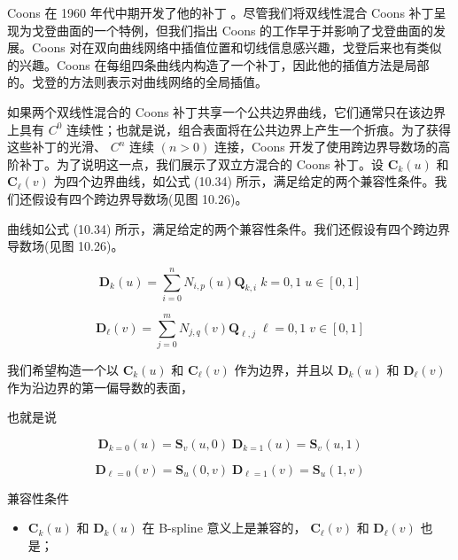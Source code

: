 \documentclass[../main.tex]{subfiles}
\begin{document}
Coons 在 1960 年代中期开发了他的补丁 \cite{Coon67}。尽管我们将双线性混合 Coons 补丁呈现为戈登曲面的一个特例，但我们指出 Coons 的工作早于并影响了戈登曲面的发展。Coons 对在双向曲线网络中插值位置和切线信息感兴趣，戈登后来也有类似的兴趣。Coons 在每组四条曲线内构造了一个补丁，因此他的插值方法是局部的。戈登的方法则表示对曲线网络的全局插值。

如果两个双线性混合的 Coons 补丁共享一个公共边界曲线，它们通常只在该边界上具有 \({C}^{0}\) 连续性；也就是说，组合表面将在公共边界上产生一个折痕。为了获得这些补丁的光滑、 \({C}^{n}\) 连续 \(\left( {n > 0}\right)\) 连接，Coons 开发了使用跨边界导数场的高阶补丁。为了说明这一点，我们展示了双立方混合的 Coons 补丁。设 \({\mathbf{C}}_{k}\left( u\right)\) 和 \({\mathbf{C}}_{\ell }\left( v\right)\) 为四个边界曲线，如公式 (10.34) 所示，满足给定的两个兼容性条件。我们还假设有四个跨边界导数场(见图 10.26)。







曲线如公式 (10.34) 所示，满足给定的两个兼容性条件。我们还假设有四个跨边界导数场(见图 10.26)。

\[
{\mathbf{D}}_{k}\left( u\right)  = \mathop{\sum }\limits_{{i = 0}}^{n}{N}_{i,p}\left( u\right) {\mathbf{Q}}_{k,i}\;k = 0,1\;u \in  \left\lbrack  {0,1}\right\rbrack
\]

\[
{\mathbf{D}}_{\ell }\left( v\right)  = \mathop{\sum }\limits_{{j = 0}}^{m}{N}_{j,q}\left( v\right) {\mathbf{Q}}_{\ell ,j}\;\ell  = 0,1\;v \in  \left\lbrack  {0,1}\right\rbrack   \tag{10.37}
\]

我们希望构造一个以 \({\mathbf{C}}_{k}\left( u\right)\) 和 \({\mathbf{C}}_{\ell }\left( v\right)\) 作为边界，并且以 \({\mathbf{D}}_{k}\left( u\right)\) 和 \({\mathbf{D}}_{\ell }\left( v\right)\) 作为沿边界的第一偏导数的表面，

也就是说

\[
{\mathbf{D}}_{k = 0}\left( u\right)  = {\mathbf{S}}_{v}\left( {u,0}\right) \;{\mathbf{D}}_{k = 1}\left( u\right)  = {\mathbf{S}}_{v}\left( {u,1}\right)
\]

\[
{\mathbf{D}}_{\ell  = 0}\left( v\right)  = {\mathbf{S}}_{u}\left( {0,v}\right) \;{\mathbf{D}}_{\ell  = 1}\left( v\right)  = {\mathbf{S}}_{u}\left( {1,v}\right)
\]

兼容性条件

\begin{itemize}
\item \({\mathbf{C}}_{k}\left( u\right)\) 和 \({\mathbf{D}}_{k}\left( u\right)\) 在 B-spline 意义上是兼容的， \({\mathbf{C}}_{\ell }\left( v\right)\) 和 \({\mathbf{D}}_{\ell }\left( v\right)\) 也是；
\end{itemize}
\end{document}
